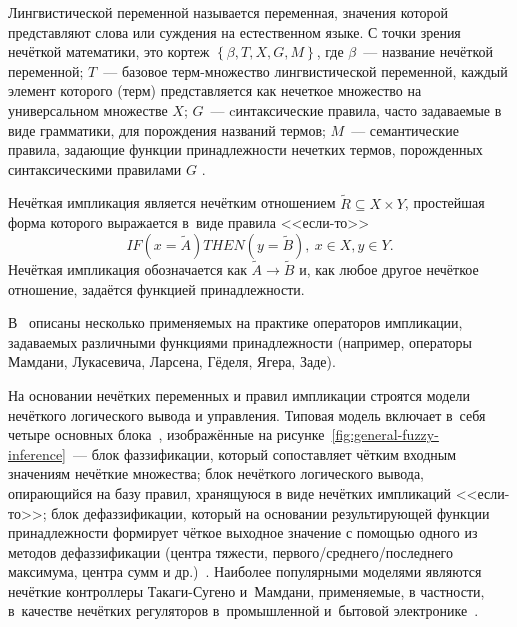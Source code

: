 \begin{mydef}
Лингвистической переменной называется переменная, значения которой представляют слова или суждения на естественном языке. С точки зрения нечёткой математики, это кортеж $\left\lbrace \beta, T, X, G, M \right\rbrace$, где $\beta$~--- название нечёткой переменной; $T$~--- базовое терм-множество лингвистической переменной, каждый элемент которого (терм) представляется как нечеткое множество на универсальном множестве $X$; $G$~--- cинтаксические правила, часто задаваемые в виде грамматики, для порождения названий термов; $M$~--- семантические правила, задающие функции принадлежности нечетких термов, порожденных синтаксическими правилами $G$ \cite{Uskov_Kuzmin, Uskov_Kruglov, Shtovba}.
\end{mydef}

\begin{mydef}
Нечёткая импликация является нечётким отношением $\tilde R \subseteq X \times Y$, простейшая форма которого выражается в~виде правила <<если-то>>~\cite{Pegat}
\begin{equation}
  IF \left( x = \tilde A \right) THEN \left( y = \tilde B\right),\ x \in X, y \in Y.
\end{equation}
Нечёткая импликация обозначается как $\tilde A \rightarrow \tilde B$ и, как любое другое нечёткое отношение, задаётся функцией принадлежности.
\end{mydef}
В~\cite{Pegat, Rutkovskaya} описаны несколько применяемых на практике операторов импликации, задаваемых различными функциями принадлежности (например, операторы Мамдани, Лукасевича, Ларсена, Гёделя, Ягера, Заде).

На основании нечётких переменных и правил импликации строятся модели нечёткого логического вывода и управления. Типовая модель включает в~себя четыре основных блока~\cite{Fuller}, изображённые на рисунке~\ref{fig:general-fuzzy-inference}~--- блок фаззификации, который сопоставляет чётким входным значениям нечёткие множества; блок нечёткого логического вывода, опирающийся на базу правил, хранящуюся в виде нечётких импликаций <<если-то>>; блок дефаззификации, который на основании результирующей функции принадлежности формирует чёткое выходное значение с помощью одного из методов дефаззификации (центра тяжести, первого/среднего/последнего максимума, центра сумм и др.)~\cite{Pegat, Uskov_Kuzmin, Uskov_Kruglov, Zak}. Наиболее популярными моделями являются нечёткие контроллеры Такаги-Сугено и~Мамдани, применяемые, в частности, в~качестве нечётких регуляторов в~промышленной и~бытовой электронике~\cite{Grinyaev_Computerra}.

